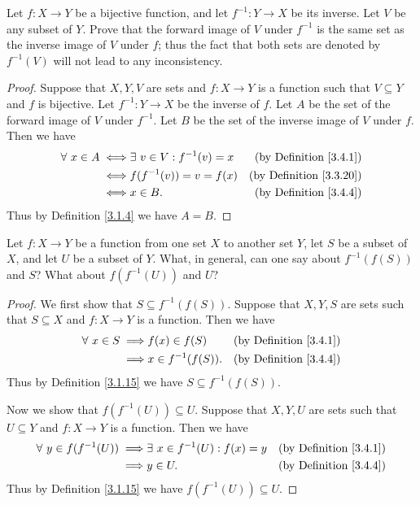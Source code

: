 \exercisesection

\begin{exercise}\label{ex 3.4.1}
Let \(f : X \to Y\) be a bijective function, and let \(f^{-1} : Y \to X\) be its inverse.
Let \(V\) be any subset of \(Y\).
Prove that the forward image of \(V\) under \(f^{-1}\) is the same set as the inverse image of \(V\) under \(f\);
thus the fact that both sets are denoted by \(f^{-1}(V)\) will not lead to any inconsistency.
\end{exercise}

\begin{proof}
Suppose that \(X, Y, V\) are sets and \(f : X \to Y\) is a function such that \(V \subseteq Y\) and \(f\) is bijective.
Let \(f^{-1} : Y \to X\) be the inverse of \(f\).
Let \(A\) be the set of the forward image of \(V\) under \(f^{-1}\).
Let \(B\) be the set of the inverse image of \(V\) under \(f\).
Then we have
\begin{align*}
\forall\ x \in A \iff & \exists\ v \in V : f^{-1}(v) = x & \text{(by Definition \ref{3.4.1})} \\
\iff & f(f^{-1}(v)) = v = f(x) & \text{(by Definition \ref{3.3.20})} \\
\iff & x \in B. & \text{(by Definition \ref{3.4.4})}
\end{align*}
Thus by Definition \ref{3.1.4} we have \(A = B\).
\end{proof}

\begin{exercise}\label{ex 3.4.2}
Let \(f : X \to Y\) be a function from one set \(X\) to another set \(Y\), let \(S\) be a subset of \(X\), and let \(U\) be a subset of \(Y\).
What, in general, can one say about \(f^{-1}(f(S))\) and \(S\)?
What about \(f(f^{-1}(U))\) and \(U\)?
\end{exercise}

\begin{proof}
We first show that \(S \subseteq f^{-1}(f(S))\).
Suppose that \(X, Y, S\) are sets such that \(S \subseteq X\) and \(f : X \to Y\) is a function.
Then we have
\begin{align*}
\forall\ x \in S \implies & f(x) \in f(S) & \text{(by Definition \ref{3.4.1})} \\
\implies & x \in f^{-1}(f(S)). & \text{(by Definition \ref{3.4.4})}
\end{align*}
Thus by Definition \ref{3.1.15} we have \(S \subseteq f^{-1}(f(S))\).

Now we show that \(f(f^{-1}(U)) \subseteq U\).
Suppose that \(X, Y, U\) are sets such that \(U \subseteq Y\) and \(f : X \to Y\) is a function.
Then we have
\begin{align*}
\forall\ y \in f(f^{-1}(U)) \implies & \exists\ x \in f^{-1}(U) : f(x) = y & \text{(by Definition \ref{3.4.1})} \\
\implies & y \in U. & \text{(by Definition \ref{3.4.4})}
\end{align*}
Thus by Definition \ref{3.1.15} we have \(f(f^{-1}(U)) \subseteq U\).
\end{proof}

